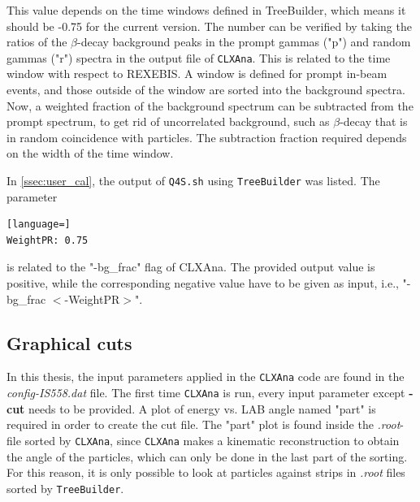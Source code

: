 \documentclass[twoside,english]{uiofysmaster/uiofysmaster}
\let\orgautoref\autoref
\renewcommand{\autoref}
        {%
		 \def\sectionautorefname{Section}%
		 \def\subsectionautorefname{Section}%
		 \def\subsubsectionautorefname{Section}%
		 \def\chapterautorefname{Chapter}%
          \orgautoref}
\begin{document}
\begin{appendices}
\begin{description}[align=left]
	\item [-bg\_frac] This value depends on the time windows defined in TreeBuilder, which means it should be -0.75 for the current version. 
	The number can be verified by taking the ratios of the $\beta$-decay background peaks in the prompt gammas ("p") and random gammas ("r") spectra in the output file of \texttt{CLXAna}.
	This is related to the time window with respect to REXEBIS. 
	A window is defined for prompt in-beam events, and those outside of the window are sorted into the background spectra. 
	Now, a weighted fraction of the background spectrum can be subtracted from the prompt spectrum, to get rid of uncorrelated background, such as $\beta$-decay that is in random coincidence with particles. 
	The subtraction fraction required depends on the width of the time window.
\end{description}

In \autoref{ssec:user_cal}, the output of \texttt{Q4S.sh} using \texttt{TreeBuilder} was listed. 
The parameter 
\begin{lstlisting}[language=]
WeightPR: 0.75
\end{lstlisting}
is related to the "-bg\_frac" flag of CLXAna. 
The provided output value is positive, while the corresponding negative value have to be given as input, i.e., "-bg\_frac $<$-WeightPR$>$".


\subsection{Graphical cuts}
In this thesis, the input parameters applied in the \texttt{CLXAna} code are found in the \textit{config-IS558.dat} file.
The first time \texttt{CLXAna} is run, every input parameter except \textbf{-cut} needs to be provided. 
A plot of energy vs. LAB angle named "part" is required in order to create the cut file. 
The "part" plot is found inside the \textit{.root}-file sorted by \texttt{CLXAna}, since \texttt{CLXAna} makes a kinematic reconstruction to obtain the angle of the particles, which can only be done in the last part of the sorting.
For this reason, it is only possible to look at particles against strips in \textit{.root} files sorted by \texttt{TreeBuilder}.


\end{appendices}
\end{document}
